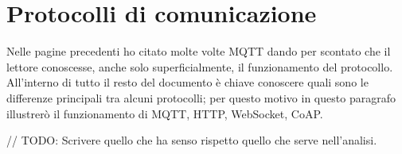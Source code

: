 \section{Protocolli di comunicazione}
\label{sec:protocolli-di-comunicazione}
%
Nelle pagine precedenti ho citato molte volte MQTT dando per scontato che il lettore conoscesse, anche solo superficialmente, il funzionamento del protocollo. All'interno di tutto il resto del documento è chiave conoscere quali sono le differenze principali tra alcuni protocolli; per questo motivo in questo paragrafo illustrerò il funzionamento di MQTT, HTTP, WebSocket, CoAP.  

// TODO: Scrivere quello che ha senso rispetto quello che serve nell'analisi.